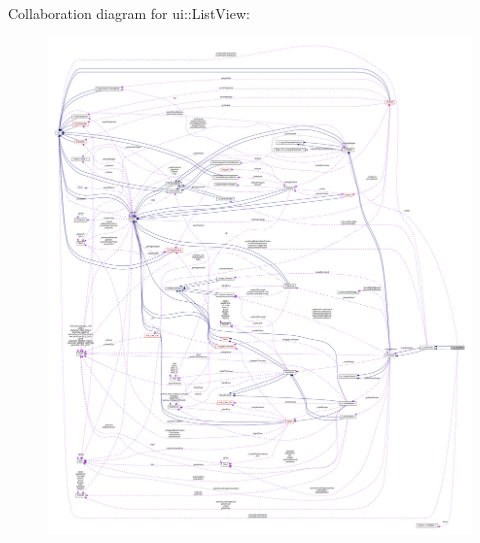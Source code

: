 Collaboration diagram for ui\+:\+:List\+View\+:
\nopagebreak
\begin{figure}[H]
\begin{center}
\leavevmode
\includegraphics[width=350pt]{classui_1_1ListView__coll__graph}
\end{center}
\end{figure}
